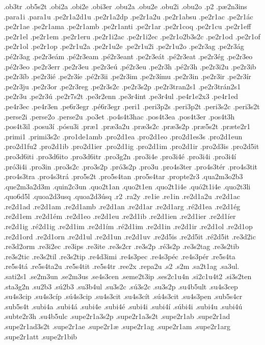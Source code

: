 {.ob3tr
.ob5s2t
.obi2a
.obi2e
.obi3er
.obu2a
.obu2e
.obu2i
.obu2o
.p2
.pæ2n3ins
.para1i
.para1u
.pe2r1a2d1u
.pe2r1a2dp
.pe2r1a2u
.pe2r1absu
.pe2r1ac
.pe2r1ác
.pe2r1ae
.pe2r1ama
.pe2r1amb
.pe2r1anti
.pe2r1ar
.pe2r1coq
.pe2r1cu
.pe2r1eff
.pe2r1el
.pe2r1em
.pe2r1eru
.pe2r1i2ac
.pe2r1i2ec
.pe2r1o2b3s2c
.pe2r1od
.pe2r1of
.pe2r1ol
.pe2r1op
.pe2r1u2a
.pe2r1u2e
.pe2r1u2i
.pe2r1u2o
.pe2r3ag
.pe2r3ág
.pé2r3ag
.pe2r3eám
.pé2r3eam
.pé2r3eant
.pe2r3eát
.pé2r3eat
.pe2r3ég
.pe2r3eo
.pé2r3eo
.pe2r3err
.pe2r3eu
.pe2r3eú
.pé2r3eu
.pe2r3h
.pé2r3h
.pe2r3i2u
.pe2r3ib
.pe2r3íb
.pe2r3ié
.pe2r3íe
.pé2r3ii
.pe2r3im
.pe2r3ímu
.pe2r3in
.pe2r3ir
.pe2r3ír
.pe2r3ju
.pe2r3or
.pe2r3reg
.pe2r3s2c
.pe2r3s2p
.pe2r3tran2s1
.pe2r3trán2s1
.pe2r3u
.pe2r3ú
.pe2r7s2t
.pe3r2enn
.pe3r4int
.pe3r4ul
.pe4r1e2x3
.pe4r1ed
.pe4r3ec
.pe4r3en
.pe6r3egr
.pé6r3egr
.peri1
.peri3p2s
.peri3p2t
.peri3s2c
.peri3s2t
.perse2i
.perse2o
.perse2u
.po3et
.po4s4t3hac
.pos4t3ea
.pos4t3er
.pos4t3h
.pos4t3il
.posu3í
.pósu3i
.præ1
.præ3a2u
.præ3s2c
.præ3s2p
.præ5s2t
.præte2r1
.primi1
.primi3s2c
.pro1de1amb
.pro2d1ea
.pro2d1eo
.pro2d1es3s
.pro2d1eun
.pro2d1fu2
.pro2d1ib
.pro2d1ier
.pro2d1ig
.pro2d1im
.pro2d1ir
.pro2d3is
.pro2d5it
.pro3d6iti
.pro3d6ito
.pro3d6itr
.pro3g2n
.pro3i4e
.pro3i4é
.pro3i4i
.pro3i4í
.pró3i4i
.pro3in
.pro3s2c
.pro3s2p
.pró3s2p
.pro3u
.pro4s3ter
.pro4s3tér
.pro4s3tit
.pro4s3tra
.pro4s3trá
.pro5s2t
.pro5s4tan
.pro5s4tar
.propte2r3
.qua2m3o2b3
.que2m3a2d3m
.quin2c3un
.quo2t1an
.quo2t1en
.quo2t1i4e
.quó2t1i4e
.quo2t3li
.quo6d5l
.quoa2d3usq
.quoa2d3úsq
.r2
.ra2y
.re1ie
.re1in
.re2d1a2u
.re2d1ac
.re2d1ad
.re2d1am
.re2d1amb
.re2d1an
.re2d1ar
.re2d1arg
.ré2d1ea
.re2d1ég
.re2d1em
.re2d1ém
.re2d1eo
.re2d1eu
.re2d1ib
.re2d1ien
.re2d1ier
.re2d1íer
.re2d1ig
.ré2d1ig
.re2d1im
.re2d1ím
.ré2d1im
.re2d1in
.re2d1ir
.re2d1ol
.re2d1op
.re2d1ord
.re2d1orn
.re2d1ul
.re2d1un
.re2d1uv
.re2d5is
.re2d5it
.ré2d5it
.re3d2ic
.re3d2orm
.re3i2ec
.re3ips
.re3ite
.re3s2cr
.re3s2p
.ré3s2p
.re3s2tag
.re3s2tib
.re3s2tic
.re3s2til
.re3s2tip
.re4d3imi
.re4s3pec
.re4s3péc
.re4s3pér
.re5s4ta
.re5s4tá
.re5s4ta2u
.re5s4tit
.re5s4tr
.ree2x
.repa2u
.s2
.s2m
.sa2t1ag
.sa3ul.
.sati2s1
.se2m3un
.se2m3us
.se4s3cen
.seme2t3ip
.ses2c1u4n
.si2c1u4t2
.si3s2ten
.sta3g2n
.su2b3
.sú2b3
.su3b4ul
.su3s2c
.sú3s2c
.su3s2p
.su4b5ult
.su4s3cep
.su4s3cip
.su4s3cíp
.sú4s3cip
.su4s3cit
.su4s3cít
.sú4s3cit
.su4s3pen
.sub5s4cr
.sub5s4t
.subi4a
.subi4á
.subi4e
.subi4é
.subi4i
.subi4í
.súbi4i
.subi4u
.subi4ú
.subte2r3h
.su4b5ulc
.supe2r1a3s2p
.supe2r1a3s2t
.supe2r1ab
.supe2r1ad
.supe2r1ad3s2t
.supe2r1ae
.supe2r1æ
.supe2r1ag
.supe2r1am
.supe2r1arg
.supe2r1att
.supe2r1bib
}
